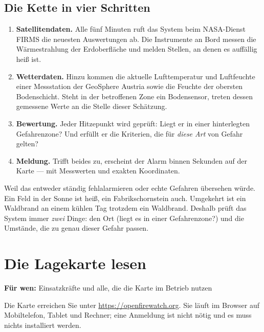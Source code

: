 \documentclass[11pt,a4paper,DIV=12,parskip=half]{scrartcl}
\newcommand{\zielgruppe}[1]{\begin{fuerwen}\textbf{Für wen:} #1\end{fuerwen}}
\begin{document}
\subsection{Die Kette in vier Schritten}

\begin{enumerate}[leftmargin=*]
  \item \textbf{Satellitendaten.} Alle fünf Minuten ruft das System beim
    NASA-Dienst FIRMS die neuesten Auswertungen ab. Die Instrumente an Bord
    messen die Wärmestrahlung der Erdoberfläche und melden Stellen, an denen
    es auffällig heiß ist.
  \item \textbf{Wetterdaten.} Hinzu kommen die aktuelle Lufttemperatur und
    Luftfeuchte einer Messstation der GeoSphere Austria sowie die Feuchte der
    obersten Bodenschicht. Steht in der betroffenen Zone ein Bodensensor,
    treten dessen gemessene Werte an die Stelle dieser Schätzung.
  \item \textbf{Bewertung.} Jeder Hitzepunkt wird geprüft: Liegt er in einer
    hinterlegten Gefahrenzone? Und erfüllt er die Kriterien, die für
    \emph{diese Art} von Gefahr gelten?
  \item \textbf{Meldung.} Trifft beides zu, erscheint der Alarm binnen Sekunden
    auf der Karte --- mit Messwerten und exakten Koordinaten.
\end{enumerate}

\begin{hinweis}[Warum nicht einfach „heiß = Alarm"?]
Weil das entweder ständig fehlalarmieren oder echte Gefahren übersehen würde.
Ein Feld in der Sonne ist heiß, ein Fabrikschornstein auch. Umgekehrt ist ein
Waldbrand an einem kühlen Tag trotzdem ein Waldbrand. Deshalb prüft das System
immer \emph{zwei} Dinge: den Ort (liegt es in einer Gefahrenzone?) und die
Umstände, die zu genau dieser Gefahr passen.
\end{hinweis}

\section{Die Lagekarte lesen}\label{sec:karte}
\zielgruppe{Einsatzkräfte und alle, die die Karte im Betrieb nutzen}

Die Karte erreichen Sie unter \url{https://openfirewatch.org}. Sie läuft im
Browser auf Mobiltelefon, Tablet und Rechner; eine Anmeldung ist nicht nötig
und es muss nichts installiert werden.
\end{document}
